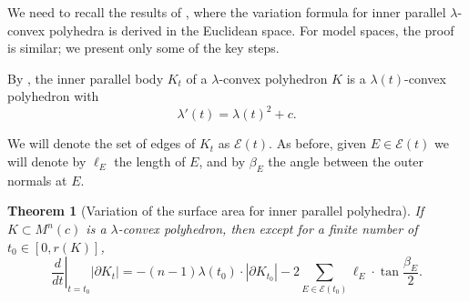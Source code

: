 \documentclass[12pt]{amsart}
\theoremstyle{theorem}
\newtheorem{theorem}{Theorem}[section]
\theoremstyle{Intro}
\theoremstyle{definition}
\theoremstyle{remark}
\theoremstyle{claim}
\numberwithin{equation}{section}
\begin{document}
We need to recall the results of \cite[Section 3.1]{DT}, where the variation formula for inner parallel $\lambda$-convex polyhedra is derived in the Euclidean space. For model spaces, the proof is similar; we present only some of the key steps.


By \cite[Corollary 3.3]{gray}, the inner parallel body $K_t$ of a $\lambda$-convex polyhedron $K$ is a $\lambda(t)$-convex polyhedron with 
\[
\lambda'(t)=\lambda(t)^2+c.
\]

We will denote the set of edges of $K_t$ as $\mathcal E(t)$.  As before, given $E \in \mathcal E(t)$ we will denote by $\ell_E$ the length of $E$, and by $\beta_E$ the angle between the outer normals at $E$.


\begin{theorem}[Variation of the surface area for inner parallel polyhedra]
    \label{Thm:Variation}
    If $K \subset M^n(c)$ is a $\lambda$-convex polyhedron, then except for a finite number of $t_0 \in [0,r(K)]$,
    \[
    \left.\frac{d}{dt}\right|_{t=t_0} |\partial K_t| = -(n-1)\lambda(t_0)\cdot |\partial K_{t_0}| - 2\sum_{E \in \mathcal E(t_0)} \ell_E \cdot \tan\frac{\beta_E}{2}.
    \]
\end{theorem}
\end{document}
